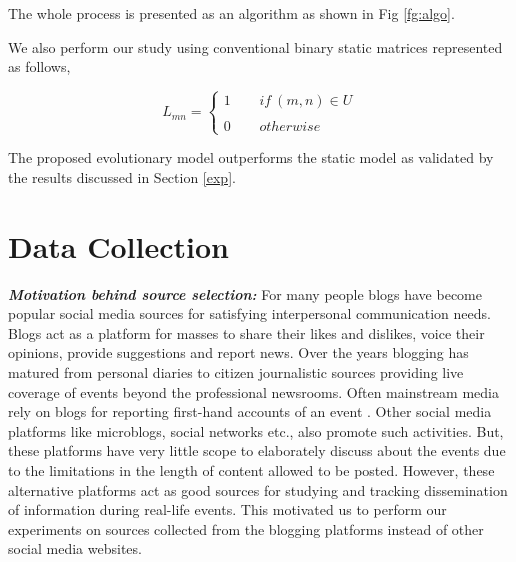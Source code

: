 \noindent The whole process is presented as an algorithm as shown in Fig \ref{fg:algo}.

\noindent 
We also perform our study using conventional binary static matrices represented as follows,


\[
L_{mn} = \left\{ \begin{array}{ccc}
1 & ~~ & if\  (m,n) \in U \\\\
0 & ~~ & otherwise \end{array} \right.
\]

The proposed evolutionary model outperforms the static model as validated by the results discussed in Section \ref{exp}.










\section{\label{data} \textbf{Data Collection}}
\noindent \textbf{\textit{Motivation behind source selection:}} For many people blogs have become popular social media sources for satisfying interpersonal communication needs. Blogs act as a platform for masses to share their likes and dislikes, voice their opinions, provide suggestions and report news. Over the years blogging has matured from personal diaries to citizen journalistic sources providing live coverage of events beyond the professional newsrooms. Often mainstream media rely on blogs for reporting first-hand accounts of an event \cite{ekdale2007expression}. Other social media platforms like microblogs, social networks etc., also promote such activities. But, these platforms have very little scope to elaborately discuss about the events due to the limitations in the length of content allowed to be posted. However, these alternative platforms act as good sources for studying and tracking dissemination of information during real-life events. This motivated us to perform our experiments on sources collected from the blogging platforms instead of other social media websites.

